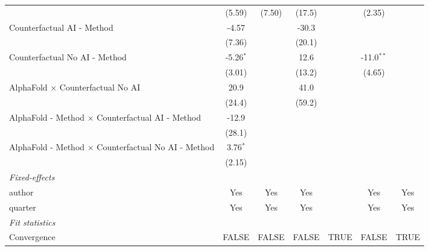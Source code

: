 \begin{tabular}{lcccccc}
                                                              & (5.59)      & (7.50)        & (17.5)  &      & (2.35)        &   \\   
   Counterfactual AI - Method                                 & -4.57       &               & -30.3   &      &               &   \\   
                                                              & (7.36)      &               & (20.1)  &      &               &   \\   
   Counterfactual No AI - Method                              & -5.26$^{*}$ &               & 12.6    &      & -11.0$^{**}$  &   \\   
                                                              & (3.01)      &               & (13.2)  &      & (4.65)        &   \\   
   AlphaFold $\times$ Counterfactual No AI                    & 20.9        &               & 41.0    &      &               &   \\   
                                                              & (24.4)      &               & (59.2)  &      &               &   \\   
   AlphaFold - Method $\times$ Counterfactual AI - Method     & -12.9       &               &         &      &               &   \\   
                                                              & (28.1)      &               &         &      &               &   \\   
   AlphaFold - Method $\times$ Counterfactual No AI - Method  & 3.76$^{*}$  &               &         &      &               &   \\   
                                                              & (2.15)      &               &         &      &               &   \\   
   \midrule
   \emph{Fixed-effects}\\
   author                                                     & Yes         & Yes           & Yes     &      & Yes           & Yes\\  
   quarter                                                    & Yes         & Yes           & Yes     &      & Yes           & Yes\\  
   \midrule
   \emph{Fit statistics}\\
   Convergence                                                &FALSE        & FALSE         & FALSE   & TRUE & FALSE         & TRUE\\  

\end{tabular}
